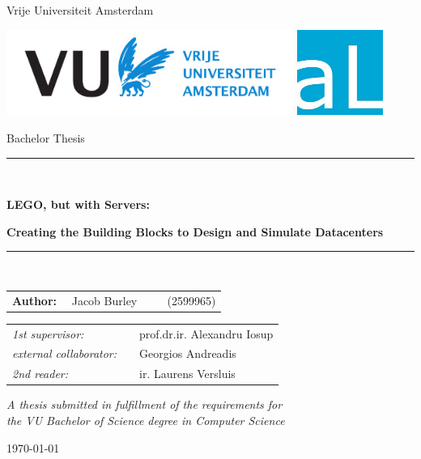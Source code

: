 \documentclass[11pt]{article}
\begin{document}
\thispagestyle{empty}
\newcommand{\opendc}{OpenDC}

\begin{center}

Vrije Universiteit Amsterdam

\vspace{1mm}

\includegraphics[height=28mm]{vu-griffioen-white.pdf}
\includegraphics[height=28mm]{atLarge.jpg}

\vspace{1.5cm}

{\Large Bachelor Thesis}

\vspace*{1.5cm}

\rule{.9\linewidth}{.6pt}\\[0.4cm]
{\huge \bfseries LEGO, but with Servers:\par}
{\Large \bfseries Creating the Building Blocks to Design and Simulate Datacenters\par}\vspace{0.4cm}
\rule{.9\linewidth}{.6pt}\\[1.5cm]

\vspace*{2mm}

{\Large
\begin{tabular}{l}
{\bf Author:} ~~Jacob Burley ~~~~ (2599965)
\end{tabular}
}

\vspace*{1.5cm}

\begin{tabular}{ll}
{\it 1st supervisor:}   & ~~prof.dr.ir. Alexandru Iosup \\
{\it external collaborator:}   & ~~Georgios Andreadis \\
{\it 2nd reader:}       & ~~ir. Laurens Versluis

\end{tabular}

\vspace*{2cm}

\textit{A thesis submitted in fulfillment of the requirements for\\ the VU Bachelor of Science degree in Computer Science}

\vspace*{1cm}

\today\\[4cm] %

\end{center}
\end{document}
